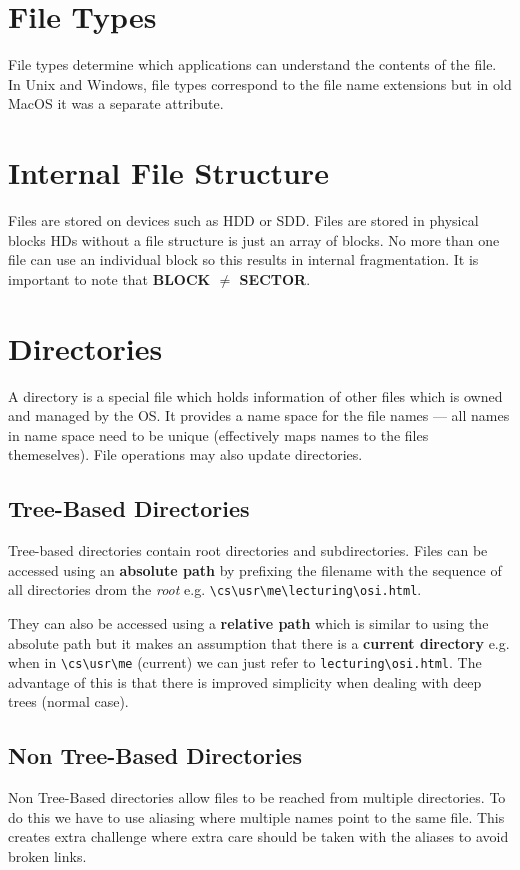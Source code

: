 \documentclass[11pt]{article}
\begin{document}
\section{File Types}
\label{sec:org7884c66}
File types determine which applications can understand the contents of the file.
In Unix and Windows, file types correspond to the file name extensions but in old MacOS it was a separate attribute.

\section{Internal File Structure}
\label{sec:orgee84179}
Files are stored on devices such as HDD or SDD.
Files are stored in physical blocks HDs without a file structure is just an array of blocks.
No more than one file can use an individual block so this results in internal fragmentation.
It is important to note that \textbf{BLOCK \(\ne\) SECTOR}.

\section{Directories}
\label{sec:org548adf4}
A directory is a special file which holds information of other files which is owned and managed by the OS.
It provides a name space for the file names --- all names in name space need to be unique (effectively maps names to the files themeselves).
File operations may also update directories.

\subsection{Tree-Based Directories}
\label{sec:orga743f38}
Tree-based directories contain root directories and subdirectories.
Files can be accessed using an \textbf{absolute path} by prefixing the filename with the sequence of all directories drom the \emph{root} e.g. \texttt{\textbackslash{}cs\textbackslash{}usr\textbackslash{}me\textbackslash{}lecturing\textbackslash{}osi.html}.

They can also be accessed using a \textbf{relative path} which is similar to using the absolute path but it makes an assumption that there is a \textbf{current directory} e.g. when in \texttt{\textbackslash{}cs\textbackslash{}usr\textbackslash{}me} (current) we can just refer to \texttt{lecturing\textbackslash{}osi.html}.
The advantage of this is that there is improved simplicity when dealing with deep trees (normal case).

\subsection{Non Tree-Based Directories}
\label{sec:orge82e840}
Non Tree-Based directories allow files to be reached from multiple directories.
To do this we have to use aliasing where multiple names point to the same file.
This creates extra challenge where extra care should be taken with the aliases to avoid broken links.
\end{document}
